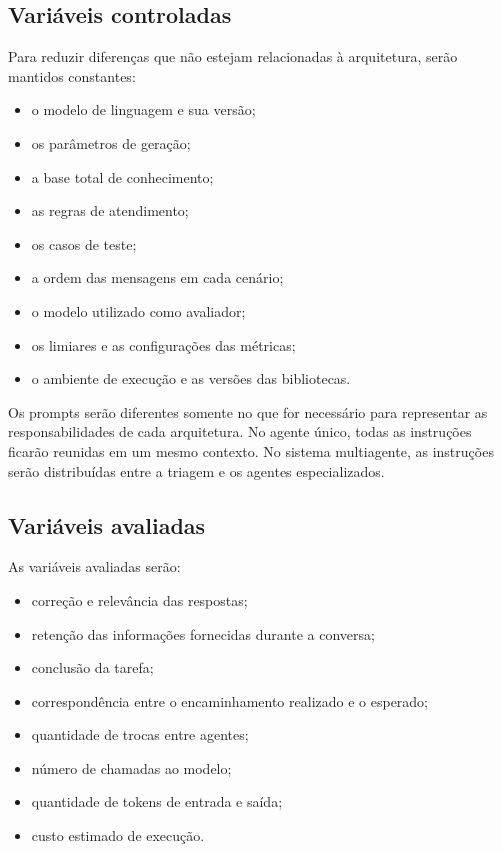 \subsection{Variáveis controladas}\label{subsec:variaveis-controladas}

Para reduzir diferenças que não estejam relacionadas à arquitetura, serão mantidos constantes:

\begin{itemize}
    \item o modelo de linguagem e sua versão;
    \item os parâmetros de geração;
    \item a base total de conhecimento;
    \item as regras de atendimento;
    \item os casos de teste;
    \item a ordem das mensagens em cada cenário;
    \item o modelo utilizado como avaliador;
    \item os limiares e as configurações das métricas;
    \item o ambiente de execução e as versões das bibliotecas.
\end{itemize}

Os prompts serão diferentes somente no que for necessário para representar as responsabilidades de cada arquitetura. No agente único, todas as instruções ficarão reunidas em um mesmo contexto. No sistema multiagente, as instruções serão distribuídas entre a triagem e os agentes especializados.

\subsection{Variáveis avaliadas}\label{subsec:variaveis-avaliadas}

As variáveis avaliadas serão:

\begin{itemize}
    \item correção e relevância das respostas;
    \item retenção das informações fornecidas durante a conversa;
    \item conclusão da tarefa;
    \item correspondência entre o encaminhamento realizado e o esperado;
    \item quantidade de trocas entre agentes;
    \item número de chamadas ao modelo;
    \item quantidade de tokens de entrada e saída;
    \item custo estimado de execução.
\end{itemize}

